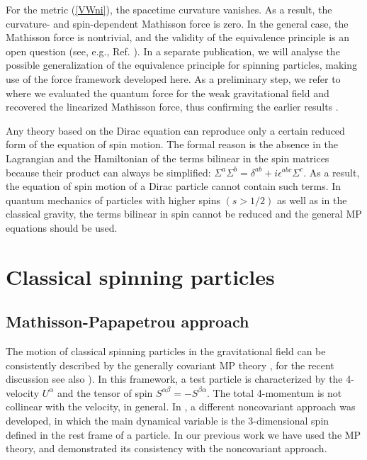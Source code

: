 \documentclass[preprint,showpacs,preprintnumbers,eqsecnum,amsmath,amssymb]{revtex4-1}
\begin{document}
For the metric (\ref{VWni}), the spacetime curvature vanishes. As a result,
the curvature- and spin-dependent Mathisson force is zero. In the general case, 
the Mathisson force is nontrivial, and the validity of the equivalence principle 
is an open question (see, e.g., Ref. \cite{Plyatsko:1997gs}). In a separate 
publication, we will analyse the possible generalization of the equivalence 
principle for spinning particles, making use of the force framework developed 
here. As a preliminary step, we refer to \cite{ostrong} where we evaluated the 
quantum force for the weak gravitational field and recovered the linearized 
Mathisson force, thus confirming the earlier results \cite{wald,barker}.

Any theory based on the Dirac equation can reproduce only a
certain reduced form of the equation of spin motion. The formal reason is the
absence in the Lagrangian and the Hamiltonian of the terms bilinear in the spin
matrices because their product can always be simplified: $\Sigma^a\Sigma^b =
\delta^{ab} + i\epsilon^{abc}\Sigma^c$. As a result, the equation of spin motion
of a Dirac particle cannot contain such terms.
In quantum mechanics of particles with higher spins $(s>1/2)$ as well as in
the classical gravity, the terms bilinear in spin cannot be reduced and the
general MP equations \cite{Mathisson,Papapetrou} should be used. 


\section{Classical spinning particles}\label{CS}

\subsection{Mathisson-Papapetrou approach}


The motion of classical spinning particles in the gravitational field
can be consistently described by the generally covariant MP theory
\cite{Mathisson,Papapetrou}, for the recent discussion see also
\cite{chicone,dinesh,plyatsko,plyatsko2}). In this framework, a test particle is
characterized by the 4-velocity $U^\alpha$ and the tensor of spin $S^{\alpha\beta}
= - S^{\beta\alpha}$. The total 4-momentum is not collinear with the velocity,
in general. In \cite{PK}, a different noncovariant approach was developed,
in which the main dynamical variable is the 3-dimensional spin defined in
the rest frame of a particle. In our previous work
\cite{PRD,PRD2,Warszawa,OST,ostrong} we have used the MP theory,
and demonstrated its consistency with the noncovariant approach.
\end{document}
